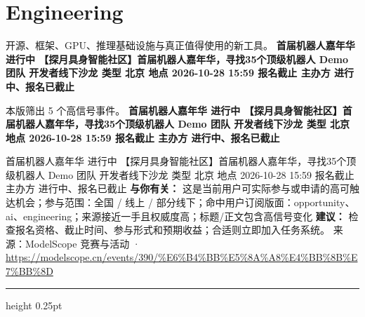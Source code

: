 \documentclass[10.5pt]{ctexart}
\begin{document}
\section*{Engineering}
{\color{ormuted} 开源、框架、GPU、推理基础设施与真正值得使用的新工具。}
\vspace{2mm}
{\LARGE\bfseries 首届机器人嘉年华 进行中 【探月具身智能社区】首届机器人嘉年华，寻找35个顶级机器人 Demo 团队 开发者线下沙龙 类型 北京 地点 2026-10-28 15:59 报名截止 主办方 进行中、报名已截止}\par
\vspace{1mm}
{\color{ormuted} 本版筛出 5 个高信号事件。}
\vspace{3mm}
{\Large\bfseries 首届机器人嘉年华 进行中 【探月具身智能社区】首届机器人嘉年华，寻找35个顶级机器人 Demo 团队 开发者线下沙龙 类型 北京 地点 2026-10-28 15:59 报名截止 主办方 进行中、报名已截止}\par
首届机器人嘉年华 进行中 【探月具身智能社区】首届机器人嘉年华，寻找35个顶级机器人 Demo 团队 开发者线下沙龙 类型 北京 地点 2026-10-28 15:59 报名截止 主办方 进行中、报名已截止
\textbf{与你有关：} 这是当前用户可实际参与或申请的高可触达机会；参与范围：全国 / 线上 / 部分线下；命中用户订阅版面：opportunity、ai、engineering；来源接近一手且权威度高；标题/正文包含高信号变化
\textbf{建议：} 检查报名资格、截止时间、参与形式和预期收益；合适则立即加入任务系统。
{\footnotesize\color{ormuted} 来源：ModelScope 竞赛与活动 · \url{https://modelscope.cn/events/390/%E6%B4%BB%E5%8A%A8%E4%BB%8B%E7%BB%8D}}
\vspace{4mm}
\hrule height 0.25pt
\vspace{3mm}
\end{document}
